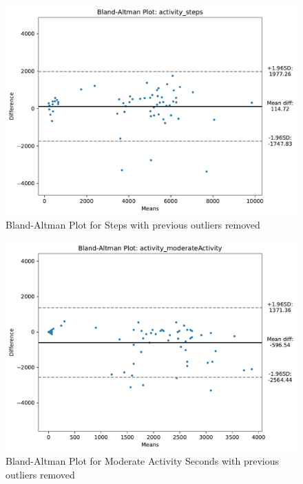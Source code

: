 \begin{figure}
    
    \centering
    \includegraphics[width=\textwidth,keepaspectratio]{../images/bland_altman_steps_no_outliers.pdf}
    \caption{Bland-Altman Plot for Steps with previous outliers removed}
    \label{fig:blandAltmanStepsNoOutliers}
    
\end{figure}
\begin{figure}
    
    \centering
    \includegraphics[width=\textwidth,keepaspectratio]{../images/bland_altman_moderateActivity_no_outliers.pdf}
    \caption{Bland-Altman Plot for Moderate Activity Seconds with previous outliers removed}
    \label{fig:blandAltmanModerateActivityNoOutliers}
    
\end{figure}
